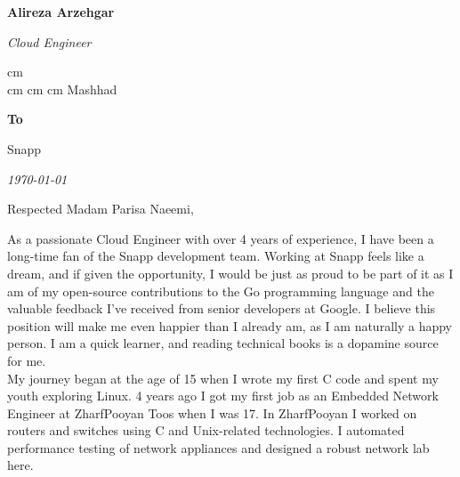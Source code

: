 \documentclass{coverletter}
\begin{document}
\textbf{\fontsize{24 pt}{24 pt}\selectfont Alireza Arzehgar}

\textit{Cloud Engineer}

\noindent\makebox[\linewidth]{\rule{\paperwidth}{0.1pt}}
\begin{center}
  \normalsize
  \mbox{}
   cm
  \mbox{}
  \\
   cm
  \mbox{}
   cm
  \mbox{}
   cm
  \mbox{{\color{black}\footnotesize\faMapMarker*}\hspace*{0.13cm}Mashhad}

  \noindent\makebox[\linewidth]{\rule{\paperwidth}{0.1pt}}
\end{center}

\textbf{To}

Snapp

\textit{\today}

\vspace{1cm}
Respected Madam Parisa Naeemi,
\vspace{0.6 cm}
\setlength{\parindent}{20pt}

As a passionate Cloud Engineer with over 4 years of experience, I have been a long-time fan of the Snapp development team.
Working at Snapp feels like a dream, and if given the opportunity,
I would be just as proud to be part of it as I am of my open-source contributions to the Go programming language
and the valuable feedback I've received from senior developers at Google.
I believe this position will make me even happier than I already am, as I am naturally a happy person.
I am a quick learner, and reading technical books is a dopamine source for me.
\\

My journey began at the age of 15 when I wrote my first C code and spent my youth exploring Linux.
4 years ago I got my first job as an Embedded Network Engineer at ZharfPooyan Toos when I was 17.
In ZharfPooyan I worked on routers and switches using C and Unix-related technologies.
I automated performance testing of network appliances and designed a robust network lab here.
\\
\end{document}
